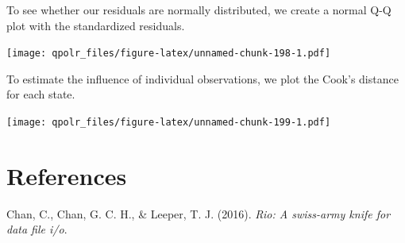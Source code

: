 \documentclass[12pt,oneside]{reedthesis}
\theoremstyle{definition}
\theoremstyle{definition}
\theoremstyle{definition}
\theoremstyle{remark}
\begin{document}
  To see whether our residuals are normally distributed, we create a
  normal Q-Q plot with the standardized residuals.
  \begin{Shaded}
  \begin{Highlighting}[]
  \OperatorTok{+}
  \StringTok{  }\NormalTok{(}\NormalTok{(}\OperatorTok{+}
  \StringTok{  }\NormalTok{() }\OperatorTok{+}
  \StringTok{  }\NormalTok{(} \NormalTok{,}
          \NormalTok{,}
          \NormalTok{)}
  \end{Highlighting}
  \end{Shaded}
  \texttt{[image: qpolr\_files/figure-latex/unnamed-chunk-198-1.pdf]}
  
  To estimate the influence of individual observations, we plot the Cook's
  distance for each state.
  \begin{Shaded}
  \begin{Highlighting}[]
  \NormalTok{(} \OperatorTok{+}
  \StringTok{  }\NormalTok{()  }\OperatorTok{+}
  \StringTok{  }\NormalTok{(} \NormalTok{,}
          \NormalTok{,}
          \NormalTok{)}
  \end{Highlighting}
  \end{Shaded}
  \texttt{[image: qpolr\_files/figure-latex/unnamed-chunk-199-1.pdf]}
  
  \backmatter
  
  \chapter{References}\label{references}
  
  \noindent
  
  \setlength{\parindent}{-0.20in} \setlength{\leftskip}{0.20in}
  \setlength{\parskip}{8pt}
  
  \hypertarget{refs}{}
  \hypertarget{ref-chanetal2016}{}
  Chan, C., Chan, G. C. H., \& Leeper, T. J. (2016). \emph{Rio: A
  swiss-army knife for data file i/o}.
  
\end{document}
